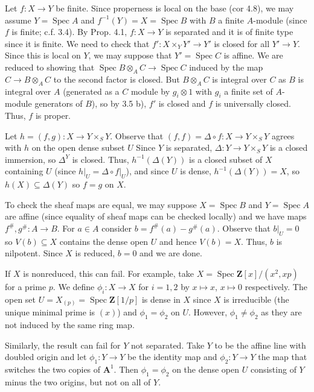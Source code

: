 \documentclass{report}
\newcommand{\Z}{\mathbf{Z}}
\newcommand{\A}{\mathbf{A}}
\DeclareMathOperator{\Spec}{Spec}
\begin{document}
	Let $f:X\rightarrow Y$ be finite.  Since properness is local on the base (cor 4.8), we may assume $Y=\Spec A$
and $f^{-1}(Y)=X=\Spec B$ with $B$ a finite $A$-module (since $f$ is finite; c.f. 3.4).
By Prop. 4.1, $f:X\rightarrow Y$ is separated
and it is of finite type since it is finite.
We need to check that $f':X\times_Y Y'\rightarrow Y'$ is closed for all $Y'\rightarrow Y$.  Since this is
local on $Y$, we may suppose that $Y'=\Spec C$ is affine.  	We are reduced to showing that 
$\Spec B\otimes_A C\rightarrow \Spec C$ induced by the map $C\rightarrow B\otimes_A C$ 
to the second factor is closed.  But $B\otimes_A C$ is integral over $C$ as $B$ is integral over $A$
(generated as a $C$ module by $g_i\otimes 1$ with $g_i$ a finite set of $A$-module generators of $B$),
so by 3.5 b), $f'$ is closed and $f$ is universally closed.  Thus, $f$ is proper.


\bigskip
{}	Let $h=(f,g):X\rightarrow Y\times_S Y$.  
Observe that $(f,f)=\Delta\circ f:X\rightarrow Y\times_S Y$ agrees with $h$ on the open dense subset $U$
Since $Y$ is separated, $\Delta:Y\rightarrow Y\times_S Y$ is a closed immersion, so $\Delta^{Y}$ is closed.
Thus, $h^{-1}(\Delta(Y))$ is a closed subset of $X$ containing $U$ (since $h\big|_U=\Delta\circ f\big|_U$),
and since $U$ is dense, $h^{-1}(\Delta(Y))=X$, so $h(X)\subseteq \Delta(Y)$ so $f=g$ on $X$.

To check the sheaf maps are equal, we may suppose $X=\Spec B$ and $Y=\Spec A$ are affine
(since equality of sheaf maps can be checked locally) and we have maps $f^{\#},g^{\#}:A\rightarrow B$.
For $a\in A$ consider $b=f^{\#}(a)-g^{\#}(a)$.  Observe that $b\big|_{U}=0$ so $V(b)\subseteq X$
contains the dense open $U$ and hence $V(b)=X$.  Thus, $b$ is nilpotent.  Since $X$ is reduced, 
$b=0$ and we are done.

If $X$ is nonreduced, this can fail.  For example, take $X=\Spec \Z[x]/(x^2,xp)$ for a prime $p$.  
We define $\phi_i:X\rightarrow X$ for $i=1,2$ by $x\mapsto x$, $x\mapsto 0$
respectively.  The open set $U=X_(p)=\Spec \Z[1/p]$ is dense in $X$ since $X$ is irreducible (the unique 
minimal prime is $(x)$) and $\phi_1=\phi_2$ on $U$.  However, $\phi_1\neq \phi_2$ as they
are not induced by the same ring map.

Similarly, the result can fail for $Y$ not separated.  Take $Y$ to be the affine line with doubled origin
and let $\phi_1:Y\rightarrow Y$ be the identity map and $\phi_2:Y\rightarrow Y$ the map that switches the two copies of $\A^1$.
Then $\phi_1=\phi_2$ on the dense open $U$ consisting of $Y$ minus the two origins, 
but not on all of $Y$.
\end{document}
